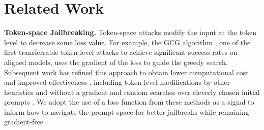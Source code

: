 \section{Related Work}
\label{related}
\textbf{Token-space Jailbreaking.} Token-space attacks \cite{shin2020autopromptelicitingknowledgelanguage,wen2023hardpromptseasygradientbased,zou2023universaltransferableadversarialattacks,hayase2024querybasedadversarialpromptgeneration,andriushchenko2024jailbreakingleadingsafetyalignedllms} modify the input at the token level to decrease some loss value. 
For example, the GCG algorithm \cite{zou2023universaltransferableadversarialattacks}, one of the first transferrable token-level attacks to achieve significant success rates on aligned models, uses the gradient of the loss to guide the greedy search.
Subsequent work has refined this approach to obtain  lower computational cost and improved effectiveness \cite{liao2024amplegcglearninguniversaltransferable,jia2024improvedtechniquesoptimizationbasedjailbreaking}, including token-level modifications by other heuristics and without a gradient \cite{hayase2024querybasedadversarialpromptgeneration} and random searches over cleverly chosen initial prompts \cite{andriushchenko2024jailbreakingleadingsafetyalignedllms}. 
We adopt the use of a loss function from these methods as a signal to inform how to navigate the prompt-space for better jailbreaks while remaining gradient-free. 

